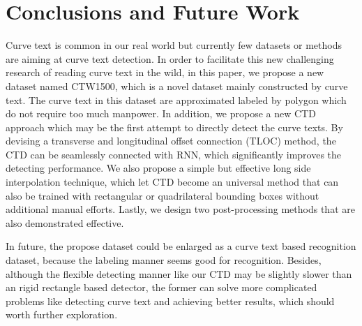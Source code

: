 \documentclass[10pt,twocolumn,letterpaper]{article}
\begin{document}
\section{Conclusions and Future Work}
Curve text is common in our real world but currently few datasets or methods are aiming at curve text detection. In order to facilitate this new challenging research of reading curve text in the wild, in this paper, we propose a new dataset named CTW1500, which is a novel dataset mainly constructed by curve text. The curve text in this dataset are approximated labeled by polygon which do not require too much manpower. In addition, we propose a new CTD approach which may be the first attempt to directly detect the curve texts. By devising a transverse and longitudinal offset connection (TLOC) method, the CTD can be seamlessly connected with RNN, which significantly improves the detecting performance.
We also propose a simple but effective long side interpolation technique, which let CTD become an universal method that can also be trained with rectangular or quadrilateral bounding boxes without additional manual efforts. Lastly, we design two post-processing methods that are also demonstrated effective.

In future, the propose dataset could be enlarged as a curve text based recognition dataset, because the labeling manner seems good for recognition. Besides, although the flexible detecting manner like our CTD  may be slightly slower than an rigid rectangle based detector, the former can solve more complicated problems like detecting curve text and achieving better results, which should worth further exploration.

{\small


}
\end{document}
